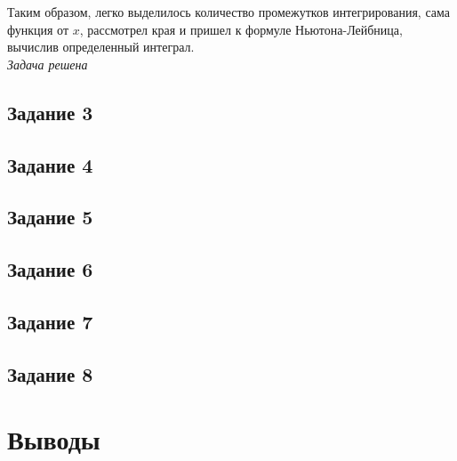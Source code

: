 \documentclass[a4paper,12pt]{article}
\begin{document}
Таким образом, легко выделилось количество промежутков интегрирования, сама функция от $x$, рассмотрел края и пришел к формуле Ньютона-Лейбница, вычислив определенный интеграл.\\
\emph{Задача решена}


\subsection{Задание 3}


\subsection{Задание 4}


\subsection{Задание 5}


\subsection{Задание 6}


\subsection{Задание 7}


\subsection{Задание 8}


\section{Выводы}
\end{document}
